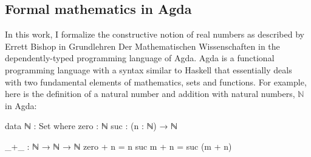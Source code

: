\documentclass[11pt,a4paper]{article}
\begin{document}
\subsection{Formal mathematics in Agda}\label{subsec: Agda}
In this work, I formalize the constructive notion of real numbers as described by Errett Bishop in Grundlehren Der Mathematischen Wissenschaften \cite{bishop:85} in the dependently-typed programming language of Agda. Agda is a functional programming language with a syntax similar to Haskell that essentially deals with two fundamental elements of mathematics, sets and functions. For example, here is the definition of a natural number and addition with natural numbers, $\mathbb{N}$ in Agda:\\

\begin{code}
data ℕ : Set where
  zero : ℕ
  suc  : (n : ℕ) → ℕ

_+_ : ℕ → ℕ → ℕ
zero  + n = n
suc m + n = suc (m + n)
\end{code}
\end{document}

